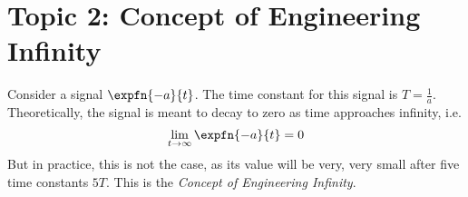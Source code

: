 \documentclass[../notes-main.tex]{subfiles}
\begin{document}
\section{Topic 2: Concept of Engineering Infinity}
Consider a signal \(\expfn{-a}{t}\). The time constant for this signal is \(T = \frac{1}{a}\). Theoretically, the signal is meant to decay to zero as time approaches infinity, i.e.
\begin{equation}
    \lim_{t \to \infty} \expfn{-a}{t} = 0 
    \label{eq:eng-infinity}
\end{equation}
But in practice, this is not the case, as its value will be very, very small after five time constants \(5T\). This is the \emph{Concept of Engineering Infinity}.
\end{document}
